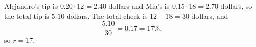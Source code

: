 Alejandro's tip is $0.20\cdot12=2.40$ dollars and Mia's is $0.15\cdot18=2.70$ dollars, so the total tip is $5.10$ dollars. The total check is $12+18=30$ dollars, and
\[\dfrac{5.10}{30}=0.17=17\%,\]
so $r=\boxed{17}$.
